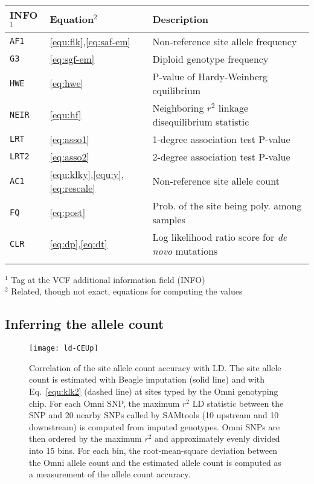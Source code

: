 \documentclass{bioinfo}
\begin{document}
\begin{table}[!htb]\label{tab:notation}
{\begin{tabular}{llp{5.6cm}}
\toprule
INFO$^1$ & Equation$^2$ & Description \\
\midrule
{\tt AF1} & \ref{equ:flk},\ref{eq:saf-em} & Non-reference site allele frequency \\
{\tt G3} & \ref{eq:sgf-em} & Diploid genotype frequency \\
{\tt HWE} & \ref{eq:hwe} & P-value of Hardy-Weinberg equilibrium \\
{\tt NEIR} & \ref{equ:hf} & Neighboring $r^2$ linkage disequilibrium statistic \\
{\tt LRT} & \ref{eq:asso1} & 1-degree association test P-value \\
{\tt LRT2} & \ref{eq:asso2} & 2-degree association test P-value \\
{\tt AC1} & \ref{equ:klky},\ref{equ:y},\ref{eq:rescale} & Non-reference site allele count \\
{\tt FQ} & \ref{eq:post} & Prob. of the site being poly. among samples \\
{\tt CLR} & \ref{eq:dp},\ref{eq:dt} & Log likelihood ratio score for {\it de novo} mutations \\
\botrule
\end{tabular}}{
$^1$ Tag at the VCF additional information field (INFO)\\
$^2$ Related, though not exact, equations for computing the values
}
\end{table}

\subsection{Inferring the allele count}

\begin{figure}[!htb]
\centering
\texttt{[image: ld-CEUp]}
\caption{Correlation of the site allele count accuracy with LD. The site allele
count is estimated with Beagle imputation (solid line) and with
Eq.~\eqref{equ:klk2} (dashed line) at sites typed by the Omni genotyping chip.
For each Omni SNP, the maximum $r^2$ LD statistic between the SNP and
20 nearby SNPs called by SAMtools (10 upstream and 10 downstream) is computed from imputed genotypes.
Omni SNPs are then ordered by the maximum $r^2$ and approximately evenly
divided into 15 bins.  For each bin, the root-mean-square deviation between the
Omni allele count and the estimated allele count is computed as a measurement
of the allele count accuracy.}\label{fig:ac}
\end{figure}
\end{document}

